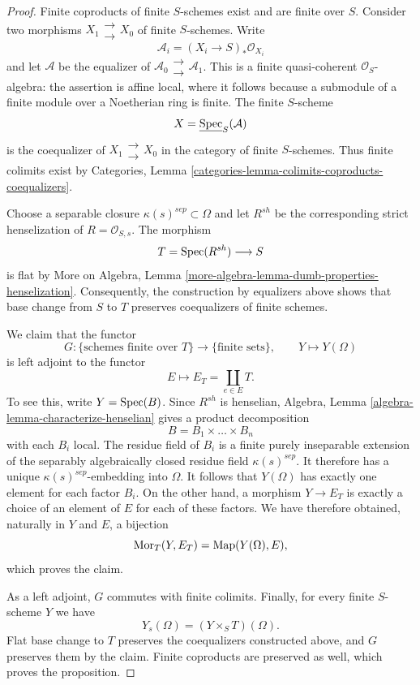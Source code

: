 \begin{proof}
Finite coproducts of finite $S$-schemes exist and are finite over $S$.
Consider two morphisms
$X_1 \mathrel{\substack{\longrightarrow \\[-0.6ex] \longrightarrow}} X_0$
of finite $S$-schemes.
Write
$$
\mathcal{A}_i = (X_i \to S)_*\mathcal{O}_{X_i}
$$
and let $\mathcal{A}$ be the equalizer of
$\mathcal{A}_0
\mathrel{\substack{\longrightarrow \\[-0.6ex] \longrightarrow}}
\mathcal{A}_1$. This is a finite
quasi-coherent $\mathcal{O}_S$-algebra: the assertion is affine local, where
it follows because a submodule of a finite module over a Noetherian ring is
finite. The finite $S$-scheme
$$
X = \underline{\mathop{\mathrm{Spec}}}_S(\mathcal{A})
$$
is the coequalizer of
$X_1 \mathrel{\substack{\longrightarrow \\[-0.6ex] \longrightarrow}} X_0$
in the category of finite $S$-schemes. Thus finite colimits exist by
Categories, Lemma
\ref{categories-lemma-colimits-coproducts-coequalizers}.

\medskip\noindent
Choose a separable closure $\kappa(s)^{sep} \subset \Omega$ and let
$R^{sh}$ be the corresponding strict henselization of
$R = \mathcal{O}_{S, s}$. The morphism
$$
T = \mathop{\mathrm{Spec}}(R^{sh}) \longrightarrow S
$$
is flat by More on Algebra, Lemma
\ref{more-algebra-lemma-dumb-properties-henselization}. Consequently, the
construction by equalizers above shows that base change from $S$ to $T$
preserves coequalizers of finite schemes.

\medskip\noindent
We claim that the functor
$$
G : \{\text{schemes finite over }T\} \longrightarrow
\{\text{finite sets}\}, \qquad Y \longmapsto Y(\Omega)
$$
is left adjoint to the functor
$$
E \longmapsto E_T = \coprod_{e \in E} T.
$$
To see this, write $Y = \mathop{\mathrm{Spec}}(B)$. Since $R^{sh}$ is henselian, Algebra,
Lemma \ref{algebra-lemma-characterize-henselian} gives a product
decomposition
$$
B = B_1 \times \ldots \times B_n
$$
with each $B_i$ local. The residue field of $B_i$ is a finite purely
inseparable extension of the separably algebraically closed residue field
$\kappa(s)^{sep}$. It therefore has a unique
$\kappa(s)^{sep}$-embedding into $\Omega$. It follows that $Y(\Omega)$ has
exactly one element for each factor $B_i$. On the other hand, a morphism
$Y \to E_T$ is exactly a choice of an element of $E$ for each of these
factors. We have therefore obtained, naturally in $Y$ and $E$, a bijection
$$
\mathop{\mathrm{Mor}}\nolimits_T(Y, E_T) = \operatorname{Map}(Y(\Omega), E),
$$
which proves the claim.

\medskip\noindent
As a left adjoint, $G$ commutes with finite colimits. Finally, for every
finite $S$-scheme $Y$ we have
$$
Y_s(\Omega) = (Y \times_S T)(\Omega).
$$
Flat base change to $T$ preserves the coequalizers constructed above, and
$G$ preserves them by the claim. Finite coproducts are preserved as well,
which proves the proposition.
\end{proof}

